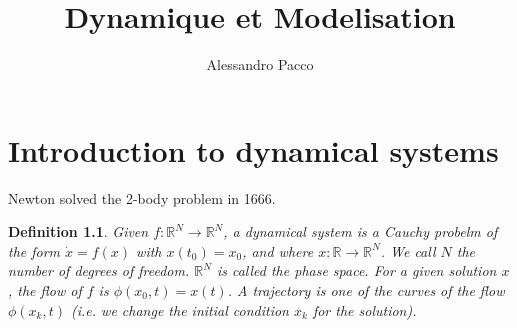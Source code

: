 \documentclass[10pt,a4paper]{book}
\author{Alessandro Pacco}
\title{Dynamique et Modelisation}
\newtheorem{definition}{Definition}
\begin{document}
\maketitle


\tableofcontents

\chapter{Introduction to dynamical systems}

Newton solved the 2-body problem in 1666. 

\begin{definition} Given $f:\mathbb{R}^N\to\mathbb{R}^N$, a dynamical system is a Cauchy probelm of the form 
$\dot{x}=f(x)$  with $x(t_0)=x_0$, and where $x:\mathbb{R}\to\mathbb{R}^N$. We call $N$ the number of degrees of freedom.  $\mathbb{R}^N$ is called the phase space. For a given solution $x$, the flow of $f$ is $\phi(x_0,t)=x(t)$. A trajectory is one of the curves of the flow $\phi(x_k,t)$ (i.e. we change the initial condition $x_k$ for the solution).
\end{definition}
\end{document}
